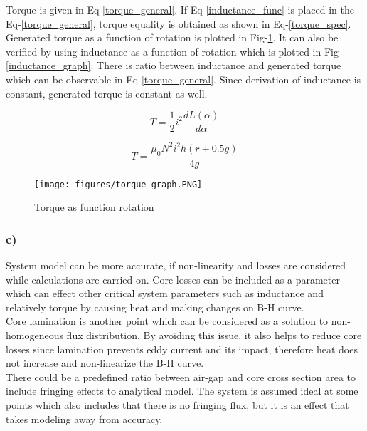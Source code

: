 \documentclass[11pt, a4paper]{article}
\begin{document}
Torque is given in Eq-\ref{torque_general}. If Eq-\ref{inductance_func} is placed in the Eq-\ref{torque_general}, torque equality is obtained as shown in Eq-\ref{torque_spec}. Generated torque as a function of rotation is plotted in Fig-\ref{torque_graph}. It can also be verified by using inductance as a function of rotation which is plotted in Fig-\ref{inductance_graph}. There is ratio between inductance and generated torque which can be observable in Eq-\ref{torque_general}. Since derivation of inductance is constant, generated torque is constant as well.

\begin{equation}
\label{torque_general}
T=\frac{1}{2} i^2 \frac{dL(\alpha)}{d \alpha}
\end{equation} 

\begin{equation}
\label{torque_spec}
T=\frac{\mu_0 N^2 i^2 h (r+0.5g)}{4g}
\end{equation} 

\begin{figure}[ht]
\centering
\texttt{[image: figures/torque\_graph.PNG]}
\caption{Torque as function rotation } \label{torque_graph}
\end{figure}


\subsubsection*{c)}

System model can be more accurate, if non-linearity and losses are considered while calculations are carried on. Core losses can be included as a parameter which can effect other critical system parameters such as inductance and relatively torque by causing heat and making changes on B-H curve. \\

Core lamination is another point which can be considered as a solution to non-homogeneous flux distribution. By avoiding this issue, it also helps to reduce core losses since lamination prevents eddy current and its impact, therefore heat does not increase and non-linearize the B-H curve. \\

There could be a predefined ratio between air-gap and core cross section area to include fringing effects to analytical model. The system is assumed ideal at some points which also includes that there is no fringing flux, but it is an effect that takes modeling away from accuracy.
\end{document}
